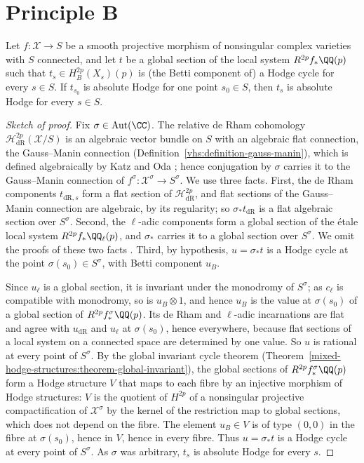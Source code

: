 \section{Principle B}\label{absolute-hodge:section-principle-b}

\begin{theorem}\label{absolute-hodge:theorem-principle-b}
Let $f \colon \mathcal{X} \to S$ be a smooth projective morphism of nonsingular complex varieties with $S$ connected, and let $t$ be a global section of the local system $R^{2p}f_*\QQ(p)$ such that
$t_s \in H^{2p}_B(X_s)(p)$ is (the Betti component of) a Hodge cycle for every $s \in S$. If $t_{s_0}$ is absolute Hodge for one point $s_0 \in S$, then $t_s$ is absolute Hodge for every $s \in S$.
\end{theorem}

\begin{proof}[Sketch of proof]
Fix $\sigma \in \mathrm{Aut}(\CC)$. The relative de Rham cohomology $\mathcal{H}^{2p}_{\mathrm{dR}}(\mathcal{X}/S)$ is an algebraic vector bundle on $S$ with an algebraic flat connection, the Gauss--Manin connection
(Definition~\ref{vhs:definition-gauss-manin}), which is defined algebraically by Katz and Oda \cite{katz-oda-1968}; hence conjugation by $\sigma$ carries it to the Gauss--Manin connection of
$f^\sigma \colon \mathcal{X}^\sigma \to S^\sigma$. We use three facts. First, the de Rham components $t_{\mathrm{dR},s}$ form a flat section of $\mathcal{H}^{2p}_{\mathrm{dR}}$, and flat sections of the Gauss--Manin
connection are algebraic, by its regularity; so $\sigma_*t_{\mathrm{dR}}$ is a flat algebraic section over $S^\sigma$. Second, the $\ell$-adic components form a global section of the \'etale local system
$R^{2p}f_*\QQ_\ell(p)$, and $\sigma_*$ carries it to a global section over $S^\sigma$. We omit the proofs of these two facts \cite{deligne-abelian}. Third, by hypothesis, $u = \sigma_*t$ is a Hodge cycle at the point
$\sigma(s_0) \in S^\sigma$, with Betti component $u_B$.

Since $u_\ell$ is a global section, it is invariant under the monodromy of $S^\sigma$; as $c_\ell$ is compatible with monodromy, so is $u_B \otimes 1$, and hence $u_B$ is the value at $\sigma(s_0)$ of a global section
of $R^{2p}f^\sigma_*\QQ(p)$. Its de Rham and $\ell$-adic incarnations are flat and agree with $u_{\mathrm{dR}}$ and $u_\ell$ at $\sigma(s_0)$, hence everywhere, because flat sections of a local system on a
connected space are determined by one value. So $u$ is rational at every point of $S^\sigma$. By the global invariant cycle theorem (Theorem~\ref{mixed-hodge-structures:theorem-global-invariant}), the global sections
of $R^{2p}f^\sigma_*\QQ(p)$ form a Hodge structure $V$ that maps to each fibre by an injective morphism of Hodge structures: $V$ is the quotient of $H^{2p}$ of a nonsingular projective compactification of
$\mathcal{X}^\sigma$ by the kernel of the restriction map to global sections, which does not depend on the fibre. The element $u_B \in V$ is of type $(0,0)$ in the fibre at $\sigma(s_0)$, hence in $V$, hence in
every fibre. Thus $u = \sigma_*t$ is a Hodge cycle at every point of $S^\sigma$. As $\sigma$ was arbitrary, $t_s$ is absolute Hodge for every $s$.
\end{proof}


